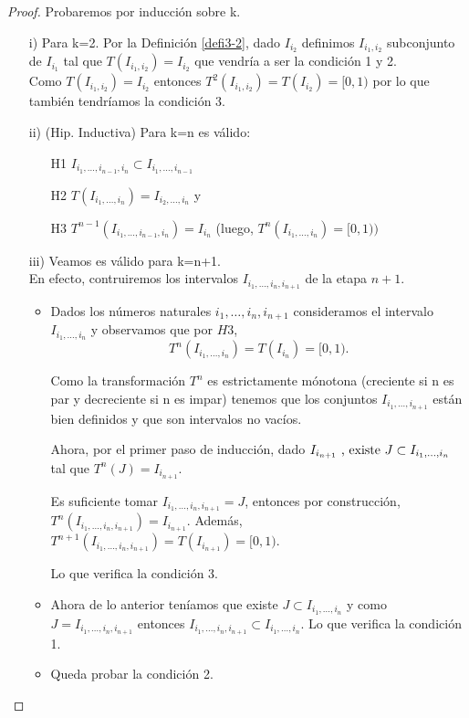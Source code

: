 \documentclass[12pt]{report}
\begin{document}
\begin{proof}
Probaremos por inducción sobre k. 
\begin{enumerate}
    \item[i)] Para k=2. Por la Definición \ref{defi3-2}, dado $I_{i_{2}}$ definimos $I_{i_{1},i_{2}}$ subconjunto de $I_{i_{1}}$ tal que $T(I_{i_{1},i_{2}})=I_{i_{2}}$ que vendría a ser la condición 1 y 2.
    \\
    Como $T(I_{i_{1},i_{2}})=I_{i_{2}}$ entonces $T^{2}(I_{i_{1},i_{2}})=T(I_{i_{2}})=[0,1)$ por lo que también tendríamos la condición 3.
    \item[ii)] (Hip. Inductiva) Para k=n es válido:
    \begin{itemize}
    \item[H1] $I_{i_{1},\ldots,i_{n-1},i_{n}}\subset I_{i_{1},\ldots,i_{n-1}}$
    \item[H2]
    $T(I_{i_{1},\ldots,i_{n}})=I_{i_{2},\ldots,i_{n}}$ y
    \item[H3] $T^{n-1}(I_{i_{1},\ldots,i_{n-1},i_{n}})=I_{i_{n}}$ (luego, $T^{n}(I_{i_{1},\ldots,i_{n}})=[0,1))$
    \end{itemize}
    \item[iii)]Veamos es válido para k=n+1. 
    \\
    En efecto, contruiremos los intervalos $I_{i_{1},\ldots,i_{n},i_{n+1}}$ de la etapa $n+1$. 
    \begin{itemize}
        \item Dados los números naturales $i_{1},\ldots,i_{n},i_{n+1}$ consideramos el intervalo $I_{i_{1},\ldots,i_{n}}$ y observamos que por $H3$,
        $$
        T^{n}(I_{i_{1},\ldots,i_{n}})=T(I_{i_{n}})=[0,1).
        $$
        
        Como la transformación $T^{n}$ es estrictamente mónotona (creciente si n es par y decreciente si n es impar) tenemos que los conjuntos $I_{i_{1},\ldots,i_{n+1}}$ están bien definidos y que son intervalos no vacíos.
        
        Ahora, por el primer paso de inducción, dado $I_{i_{n+1}} \text{ , existe } \\
        J\subset I_{i_{1},\ldots,i_{n}}$ tal que $T^{n}(J)=I_{i_{n+1}}$.
        
        Es suficiente tomar $I_{i_{1},\ldots,i_{n},i_{n+1}}=J$, entonces por construcción, $T^{n}(I_{i_{1},\ldots,i_{n},i_{n+1}})=I_{i_{n+1}}.$
        Además, $T^{n+1}(I_{i_{1},\ldots,i_{n},i_{n+1}})=T(I_{i_{n+1}})=[0,1)$.
        
        Lo que verifica la condición 3.
        \item Ahora de lo anterior teníamos que existe $J \subset I_{i_{1},\ldots,i_{n}}$ y como $J=I_{i_{1},\ldots,i_{n},i_{n+1}}$ entonces $I_{i_{1},\ldots,i_{n},i_{n+1}}\subset I_{i_{1},\ldots,i_{n}}$.
        Lo que verifica la condición 1.
        \item Queda probar la condición 2.
        

\end{itemize}
\end{enumerate}
\end{proof}
\end{document}
